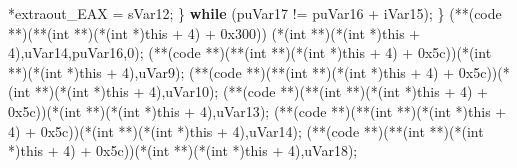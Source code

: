 \documentclass[
]{article}
\newenvironment{Shaded}{}{}
\newcommand{\BaseNTok}[1]{\textcolor[rgb]{0.25,0.63,0.44}{#1}}
\newcommand{\ControlFlowTok}[1]{\textcolor[rgb]{0.00,0.44,0.13}{\textbf{#1}}}
\newcommand{\DataTypeTok}[1]{\textcolor[rgb]{0.56,0.13,0.00}{#1}}
\newcommand{\DecValTok}[1]{\textcolor[rgb]{0.25,0.63,0.44}{#1}}
\newcommand{\NormalTok}[1]{#1}
\newcommand{\OperatorTok}[1]{\textcolor[rgb]{0.40,0.40,0.40}{#1}}
\begin{document}
\begin{Shaded}
\begin{Highlighting}[]
          \OperatorTok{*}\NormalTok{extraout\_EAX }\OperatorTok{=}\NormalTok{ sVar12}\OperatorTok{;}
        \OperatorTok{\}} \ControlFlowTok{while} \OperatorTok{(}\NormalTok{puVar17 }\OperatorTok{!=}\NormalTok{ puVar16 }\OperatorTok{+}\NormalTok{ iVar15}\OperatorTok{);}
      \OperatorTok{\}}
      \OperatorTok{(**(}\NormalTok{code }\OperatorTok{**)(**(}\DataTypeTok{int} \OperatorTok{**)(*(}\DataTypeTok{int} \OperatorTok{*)}\NormalTok{this }\OperatorTok{+} \DecValTok{4}\OperatorTok{)} \OperatorTok{+} \BaseNTok{0x300}\OperatorTok{))}
                \OperatorTok{(*(}\DataTypeTok{int} \OperatorTok{**)(*(}\DataTypeTok{int} \OperatorTok{*)}\NormalTok{this }\OperatorTok{+} \DecValTok{4}\OperatorTok{),}\NormalTok{uVar14}\OperatorTok{,}\NormalTok{puVar16}\OperatorTok{,}\DecValTok{0}\OperatorTok{);}
      \OperatorTok{(**(}\NormalTok{code }\OperatorTok{**)(**(}\DataTypeTok{int} \OperatorTok{**)(*(}\DataTypeTok{int} \OperatorTok{*)}\NormalTok{this }\OperatorTok{+} \DecValTok{4}\OperatorTok{)} \OperatorTok{+} \BaseNTok{0x5c}\OperatorTok{))(*(}\DataTypeTok{int} \OperatorTok{**)(*(}\DataTypeTok{int} \OperatorTok{*)}\NormalTok{this }\OperatorTok{+} \DecValTok{4}\OperatorTok{),}\NormalTok{uVar9}\OperatorTok{);}
      \OperatorTok{(**(}\NormalTok{code }\OperatorTok{**)(**(}\DataTypeTok{int} \OperatorTok{**)(*(}\DataTypeTok{int} \OperatorTok{*)}\NormalTok{this }\OperatorTok{+} \DecValTok{4}\OperatorTok{)} \OperatorTok{+} \BaseNTok{0x5c}\OperatorTok{))(*(}\DataTypeTok{int} \OperatorTok{**)(*(}\DataTypeTok{int} \OperatorTok{*)}\NormalTok{this }\OperatorTok{+} \DecValTok{4}\OperatorTok{),}\NormalTok{uVar10}\OperatorTok{);}
      \OperatorTok{(**(}\NormalTok{code }\OperatorTok{**)(**(}\DataTypeTok{int} \OperatorTok{**)(*(}\DataTypeTok{int} \OperatorTok{*)}\NormalTok{this }\OperatorTok{+} \DecValTok{4}\OperatorTok{)} \OperatorTok{+} \BaseNTok{0x5c}\OperatorTok{))(*(}\DataTypeTok{int} \OperatorTok{**)(*(}\DataTypeTok{int} \OperatorTok{*)}\NormalTok{this }\OperatorTok{+} \DecValTok{4}\OperatorTok{),}\NormalTok{uVar13}\OperatorTok{);}
      \OperatorTok{(**(}\NormalTok{code }\OperatorTok{**)(**(}\DataTypeTok{int} \OperatorTok{**)(*(}\DataTypeTok{int} \OperatorTok{*)}\NormalTok{this }\OperatorTok{+} \DecValTok{4}\OperatorTok{)} \OperatorTok{+} \BaseNTok{0x5c}\OperatorTok{))(*(}\DataTypeTok{int} \OperatorTok{**)(*(}\DataTypeTok{int} \OperatorTok{*)}\NormalTok{this }\OperatorTok{+} \DecValTok{4}\OperatorTok{),}\NormalTok{uVar14}\OperatorTok{);}
      \OperatorTok{(**(}\NormalTok{code }\OperatorTok{**)(**(}\DataTypeTok{int} \OperatorTok{**)(*(}\DataTypeTok{int} \OperatorTok{*)}\NormalTok{this }\OperatorTok{+} \DecValTok{4}\OperatorTok{)} \OperatorTok{+} \BaseNTok{0x5c}\OperatorTok{))(*(}\DataTypeTok{int} \OperatorTok{**)(*(}\DataTypeTok{int} \OperatorTok{*)}\NormalTok{this }\OperatorTok{+} \DecValTok{4}\OperatorTok{),}\NormalTok{uVar18}\OperatorTok{);}

\end{Highlighting}
\end{Shaded}
\end{document}
